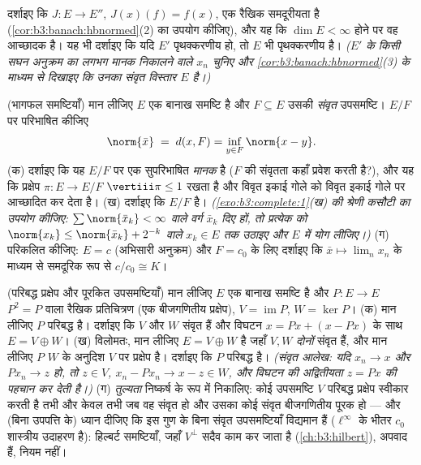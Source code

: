 \begin{exercise}[$\star\star$]\label{exo:b3:banach:10}
दर्शाइए कि $J \colon E \to E''$, $J(x)(f) = f(x)$, एक रैखिक समदूरीयता है (\cref{cor:b3:banach:hbnormed}(2) का उपयोग
कीजिए), और यह कि $\dim E < \infty$ होने पर वह आच्छादक है। यह भी दर्शाइए कि
यदि $E'$ पृथक्करणीय हो, तो $E$ भी पृथक्करणीय है। \emph{($E'$
के किसी सघन अनुक्रम का लगभग मानक निकालने वाले $x_n$ चुनिए और
\cref{cor:b3:banach:hbnormed}(3) के माध्यम से दिखाइए कि उनका संवृत विस्तार $E$ है।)}
\end{exercise}

\begin{exercise}[$\star\star$]\label{exo:b3:banach:11}
(भागफल समष्टियाँ) मान लीजिए $E$ एक बानाख समष्टि है और $F \subseteq
E$
उसकी \emph{संवृत} उपसमष्टि। $E/F$ पर परिभाषित कीजिए
\[
\norm{\bar x} \;=\; d(x, F) = \inf_{y\in F}\norm{x - y} .
\]
(क) दर्शाइए कि यह $E/F$ पर एक सुपरिभाषित \emph{मानक} है ($F$ की
संवृतता कहाँ प्रवेश करती है?), और यह कि प्रक्षेप $\pi
\colon E \to E/F$ $\vertiii\pi \leq 1$
रखता है और विवृत इकाई गोले को विवृत इकाई गोले पर आच्छादित कर देता
है।
(ख) दर्शाइए कि $E/F$  है। \emph{(\cref{exo:b3:complete:1}(ख) की श्रेणी कसौटी का
उपयोग कीजिए: $\sum\norm{\bar x_k} < \infty$ वाले वर्ग $\bar x_k$ दिए हों, तो प्रत्येक को $\norm{x_k} \leq \norm{\bar x_k} + 2^{-k}$
वाले $x_k \in E$ तक उठाइए और $E$ में योग लीजिए।)}
(ग) परिकलित कीजिए: $E = c$ (अभिसारी अनुक्रम) और $F =
c_0$ के लिए
दर्शाइए कि $\bar x \mapsto
\lim_nx_n$ के माध्यम से समदूरिक रूप से $c/c_0 \cong K$।
\end{exercise}

\begin{exercise}[$\star\star$]\label{exo:b3:banach:12}
(परिबद्ध प्रक्षेप और पूरकित उपसमष्टियाँ) मान लीजिए $E$ एक बानाख
समष्टि है और $P \colon E \to E$ $P^2 = P$ वाला रैखिक प्रतिचित्रण (एक बीजगणितीय
प्रक्षेप), $V = \operatorname{im}P$, $W =
\ker P$।
(क) मान लीजिए $P$ परिबद्ध है। दर्शाइए कि $V$ और $W$ संवृत
हैं और विघटन $x = Px + (x -
Px)$ के साथ $E = V \oplus W$।
(ख) विलोमतः, मान लीजिए $E = V \oplus W$ है जहाँ $V,
W$ \emph{दोनों} संवृत
हैं, और मान लीजिए $P$ $W$ के अनुदिश $V$ पर प्रक्षेप है।
दर्शाइए कि $P$ परिबद्ध है। \emph{(संवृत आलेख: यदि $x_n \to x$ और
$Px_n \to z$ हो, तो $z \in V$, $x_n - Px_n \to x - z \in
W$, और विघटन की अद्वितीयता $z =
Px$ की पहचान
कर देती है।)}
(ग) \emph{तुल्यता} निष्कर्ष के रूप में निकालिए: कोई उपसमष्टि
$V$ परिबद्ध प्रक्षेप स्वीकार करती है तभी और केवल तभी जब वह
संवृत हो और उसका कोई संवृत बीजगणितीय पूरक हो --- और (बिना
उपपत्ति के) ध्यान दीजिए कि इस गुण के बिना संवृत उपसमष्टियाँ
विद्यमान हैं ($\ell^\infty$ के भीतर $c_0$ शास्त्रीय उदाहरण है): हिल्बर्ट
समष्टियाँ, जहाँ $V^\perp$ सदैव काम कर जाता है (\cref{ch:b3:hilbert}), अपवाद हैं,
नियम नहीं।
\end{exercise}

